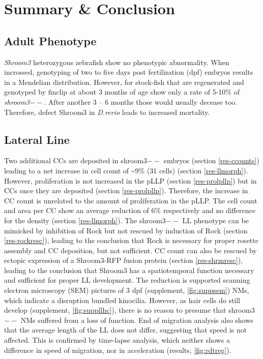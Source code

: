 \documentclass[11pt,singlespacinge,twoside]{reedthesis} %
\begin{document}
\hypertarget{summary-conclusion}{%
\chapter{Summary \& Conclusion}\label{summary-conclusion}}

\hypertarget{adult-phenotype}{%
\section{Adult Phenotype}\label{adult-phenotype}}

\emph{Shroom3} heterozygous zebrafish show no phenotypic abnormality. When incrossed, genotyping of two to five days post fertilization (dpf) embryos results in a Mendelian distribution. However, for stock-fish that are regenerated and genotyped by finclip at about 3 months of age show only a rate of 5-10\(\%\) of \emph{shroom3}\(--\). After another 3 -- 6 months those would usually decease too. Therefore, defect Shroom3 in \emph{D.rerio} leads to increased mortality.

\hypertarget{lateral-line}{%
\section{Lateral Line}\label{lateral-line}}

Two additional CCs are deposited in shroom3\(--\) embryos (section \ref{res-ccounts}) leading to a net increase in cell count of \textasciitilde{}9\(\%\) (31 cells) (section \ref{res-llmorph}). However, proliferation is not increased in the pLLP (section \ref{res-prolpllp}) but in CCs once they are deposited (section \ref{res-prolpllp}). Therefore, the increase in CC count is unrelated to the amount of proliferation in the pLLP. The cell count and area per CC show an average reduction of 6\(\%\) respectively and no difference for the density (section \ref{res-llmorph}).
The shroom3\(--\) LL phenotype can be mimicked by inhibition of Rock but not rescued by induction of Rock (section \ref{res-rockresc}), leading to the conclusion that Rock is necessary for proper rosette assembly and CC deposition, but not sufficient. CC count can also be rescued by ectopic expression of a Shroom3-RFP fusion protein (section \ref{res-shrmresc}), leading to the conclusion that Shroom3 has a spatiotemporal function necessary and sufficient for proper LL development.
The reduction is supported scanning electron microscopy (SEM) pictures of 3 dpf (supplement, \ref{fig:suppsem}) NMs, which indicate a disruption bundled kinocilia. However, as hair cells do still develop (supplement, \ref{fig:suppllhc}), there is no reason to presume that shroom3\(--\) NMs suffered from a loss of function. End of migration analysis also shows that the average length of the LL does not differ, suggesting that speed is not affected. This is confirmed by time-lapse analysis, which neither shows a difference in speed of migration, nor in acceleration (results, \ref{fig:rdtreg}).
\end{document}

